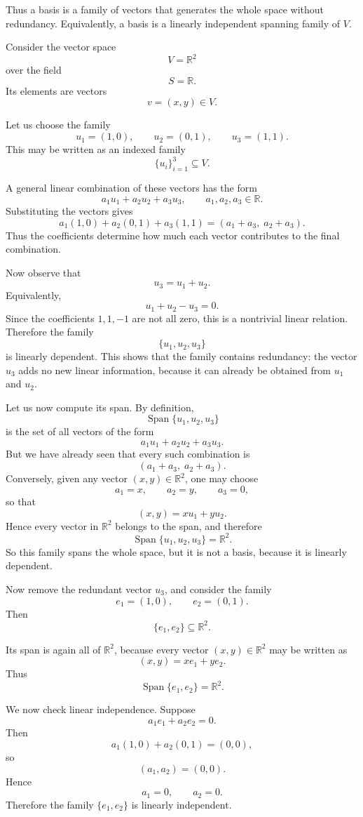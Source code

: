 \documentclass[12pt]{article}
\begin{document}
	Thus a basis is a family of vectors that generates the whole space without redundancy. Equivalently, a basis is a linearly independent spanning family of \(V\).
	
	Consider the vector space
	\[
	V=\mathbb{R}^2
	\]
	over the field
	\[
	S=\mathbb{R}.
	\]
	Its elements are vectors
	\[
	v=(x,y)\in V.
	\]
	
	Let us choose the family
	\[
	u_1=(1,0),\qquad u_2=(0,1),\qquad u_3=(1,1).
	\]
	This may be written as an indexed family
	\[
	\{u_i\}_{i=1}^3\subseteq V.
	\]
	
	A general linear combination of these vectors has the form
	\[
	a_1u_1+a_2u_2+a_3u_3,
	\qquad a_1,a_2,a_3\in\mathbb{R}.
	\]
	Substituting the vectors gives
	\[
	a_1(1,0)+a_2(0,1)+a_3(1,1)
	=
	(a_1+a_3,\; a_2+a_3).
	\]
	Thus the coefficients determine how much each vector contributes to the final combination.
	
	Now observe that
	\[
	u_3=u_1+u_2.
	\]
	Equivalently,
	\[
	u_1+u_2-u_3=0.
	\]
	Since the coefficients \(1,1,-1\) are not all zero, this is a nontrivial linear relation. Therefore the family
	\[
	\{u_1,u_2,u_3\}
	\]
	is linearly dependent. This shows that the family contains redundancy: the vector \(u_3\) adds no new linear information, because it can already be obtained from \(u_1\) and \(u_2\).
	
	Let us now compute its span. By definition,
	\[
	\operatorname{Span}\{u_1,u_2,u_3\}
	\]
	is the set of all vectors of the form
	\[
	a_1u_1+a_2u_2+a_3u_3.
	\]
	But we have already seen that every such combination is
	\[
	(a_1+a_3,\; a_2+a_3).
	\]
	Conversely, given any vector \((x,y)\in\mathbb{R}^2\), one may choose
	\[
	a_1=x,\qquad a_2=y,\qquad a_3=0,
	\]
	so that
	\[
	(x,y)=xu_1+yu_2.
	\]
	Hence every vector in \(\mathbb{R}^2\) belongs to the span, and therefore
	\[
	\operatorname{Span}\{u_1,u_2,u_3\}=\mathbb{R}^2.
	\]
	So this family spans the whole space, but it is not a basis, because it is linearly dependent.
	
	Now remove the redundant vector \(u_3\), and consider the family
	\[
	e_1=(1,0),\qquad e_2=(0,1).
	\]
	Then
	\[
	\{e_1,e_2\}\subseteq \mathbb{R}^2.
	\]
	
	Its span is again all of \(\mathbb{R}^2\), because every vector \((x,y)\in\mathbb{R}^2\) may be written as
	\[
	(x,y)=xe_1+ye_2.
	\]
	Thus
	\[
	\operatorname{Span}\{e_1,e_2\}=\mathbb{R}^2.
	\]
	
	We now check linear independence. Suppose
	\[
	a_1e_1+a_2e_2=0.
	\]
	Then
	\[
	a_1(1,0)+a_2(0,1)=(0,0),
	\]
	so
	\[
	(a_1,a_2)=(0,0).
	\]
	Hence
	\[
	a_1=0,\qquad a_2=0.
	\]
	Therefore the family \(\{e_1,e_2\}\) is linearly independent.
	
\end{document}
